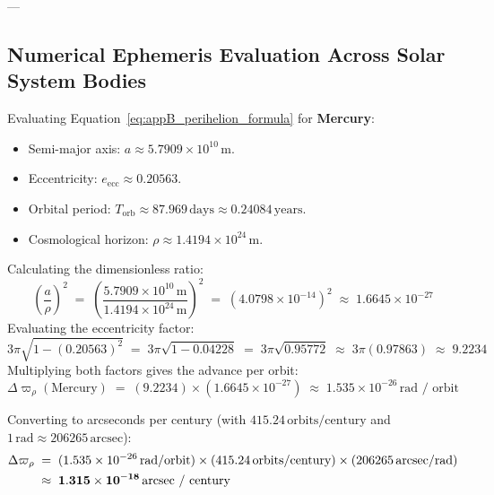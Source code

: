 \documentclass[
    12pt,
    a4paper,
    headings=normal,
    twoside=false,
    open=any,
    parskip=half
]{scrbook}
\begin{document}
---

\subsection{Numerical Ephemeris Evaluation Across Solar System Bodies}

Evaluating Equation~\eqref{eq:appB_perihelion_formula} for \textbf{Mercury}:
\begin{itemize}[noitemsep]
    \item Semi-major axis: $a \approx 5.7909 \times 10^{10}\,\text{m}$.
    \item Eccentricity: $e_{\text{ecc}} \approx 0.20563$.
    \item Orbital period: $T_{\text{orb}} \approx 87.969\,\text{days} \approx 0.24084\,\text{years}$.
    \item Cosmological horizon: $\rho \approx 1.4194 \times 10^{24}\,\text{m}$.
\end{itemize}

Calculating the dimensionless ratio:
\begin{equation}
\left( \frac{a}{\rho} \right)^2 \;=\; \left( \frac{5.7909 \times 10^{10} \, \text{m}}{1.4194 \times 10^{24} \, \text{m}} \right)^2 \;=\; \left( 4.0798 \times 10^{-14} \right)^2 \;\approx\; 1.6645 \times 10^{-27}
\end{equation}
Evaluating the eccentricity factor:
\begin{equation}
3\pi \sqrt{1 - (0.20563)^2} \;=\; 3\pi \sqrt{1 - 0.04228} \;=\; 3\pi \sqrt{0.95772} \;\approx\; 3\pi(0.97863) \;\approx\; 9.2234
\end{equation}
Multiplying both factors gives the advance per orbit:
\begin{equation}
\Delta\varpi_{\rho}(\text{Mercury}) \;=\; (9.2234) \times (1.6645 \times 10^{-27}) \;\approx\; 1.535 \times 10^{-26} \, \text{rad / orbit}
\end{equation}

Converting to arcseconds per century (with $415.24\,\text{orbits/century}$ and $1\,\text{rad} \approx 206265\,\text{arcsec}$):
\begin{align}
\Delta\varpi_{\rho} &\;=\; (1.535 \times 10^{-26} \, \text{rad/orbit}) \times (415.24 \, \text{orbits/century}) \times (206265 \, \text{arcsec/rad}) \notag \\
&\;\approx\; \mathbf{1.315 \times 10^{-18} \, \text{arcsec / century}}
\label{eq:appB_mercury_precession_numerical_val}
\end{align}
\end{document}
